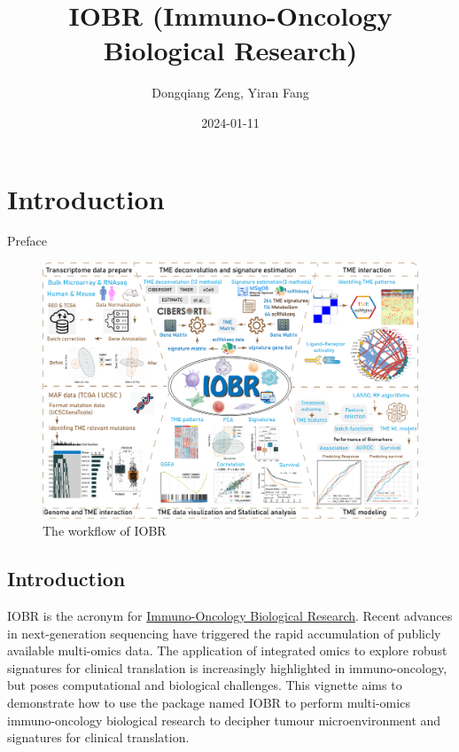 \documentclass[
  12pt,
]{book}
\title{IOBR (Immuno-Oncology Biological Research)}
\author{Dongqiang Zeng, Yiran Fang}
\date{2024-01-11}
\begin{document}
\maketitle

{
\setcounter{tocdepth}{1}
\tableofcontents
}
\hypertarget{introduction}{%
\chapter*{\texorpdfstring{\textbf{Introduction}}{Introduction}}\label{introduction}}

Preface

\begin{figure}

{\centering \includegraphics[width=0.95\linewidth]{./fig/IOBR-Workflow} 

}

\caption{The workflow of IOBR}\label{fig:unnamed-chunk-1}
\end{figure}

\hypertarget{introduction-1}{%
\section{Introduction}\label{introduction-1}}

IOBR is the acronym for \href{https://github.com/IOBR/IOBR}{Immuno-Oncology Biological Research}.
Recent advances in next-generation sequencing have triggered the rapid accumulation of publicly available multi-omics data. The application of integrated omics to explore robust signatures for clinical translation is increasingly highlighted in immuno-oncology, but poses computational and biological challenges. This vignette aims to demonstrate how to use the package named IOBR to perform multi-omics immuno-oncology biological research to decipher tumour microenvironment and signatures for clinical translation.
\end{document}
